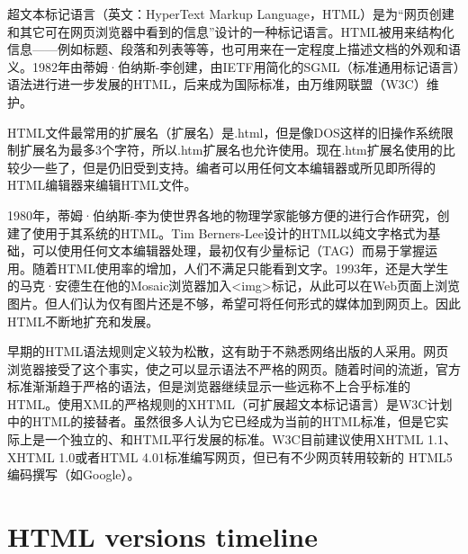 超文本标记语言（英文：HyperText Markup Language，HTML）是为“网页创建和其它可在网页浏览器中看到的信息”设计的一种标记语言。HTML被用来结构化信息——例如标题、段落和列表等等，也可用来在一定程度上描述文档的外观和语义。1982年由蒂姆·伯纳斯-李创建，由IETF用简化的SGML（标准通用标记语言）语法进行进一步发展的HTML，后来成为国际标准，由万维网联盟（W3C）维护。

HTML文件最常用的扩展名（扩展名）是.html，但是像DOS这样的旧操作系统限制扩展名为最多3个字符，所以.htm扩展名也允许使用。现在.htm扩展名使用的比较少一些了，但是仍旧受到支持。编者可以用任何文本编辑器或所见即所得的HTML编辑器来编辑HTML文件。

1980年，蒂姆·伯纳斯-李为使世界各地的物理学家能够方便的进行合作研究，创建了使用于其系统的HTML。Tim Berners-Lee设计的HTML以纯文字格式为基础，可以使用任何文本编辑器处理，最初仅有少量标记（TAG）而易于掌握运用。随着HTML使用率的增加，人们不满足只能看到文字。1993年，还是大学生的马克·安德生在他的Mosaic浏览器加入<img>标记，从此可以在Web页面上浏览图片。但人们认为仅有图片还是不够，希望可将任何形式的媒体加到网页上。因此HTML不断地扩充和发展。

早期的HTML语法规则定义较为松散，这有助于不熟悉网络出版的人采用。网页浏览器接受了这个事实，使之可以显示语法不严格的网页。随着时间的流逝，官方标准渐渐趋于严格的语法，但是浏览器继续显示一些远称不上合乎标准的HTML。使用XML的严格规则的XHTML（可扩展超文本标记语言）是W3C计划中的HTML的接替者。虽然很多人认为它已经成为当前的HTML标准，但是它实际上是一个独立的、和HTML平行发展的标准。W3C目前建议使用XHTML 1.1、XHTML 1.0或者HTML 4.01标准编写网页，但已有不少网页转用较新的 HTML5 编码撰写（如Google）。

\section{HTML versions timeline}

